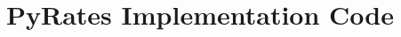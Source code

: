 \chapter{PyRates Implementation Code}


\inputminted[mathescape, frame=lines, framesep=2mm,baselinestretch=1.2,fontsize=\tiny,linenos, bgcolor=LightGray]{python3}{code_snippets/minimal_fig5.py}